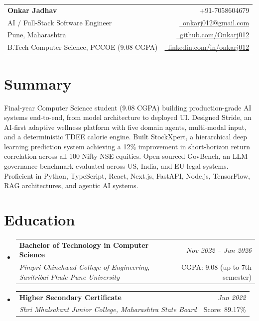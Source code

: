 \documentclass[a4paper,11pt]{article}
\makeatletter
\newcommand{\resumeSubheading}[4]{
\vspace{0.5mm}\item
    \begin{tabular*}{0.98\textwidth}[t]{l@{\extracolsep{\fill}}r}
        \textbf{#1} & \textit{\footnotesize{#4}} \\
        \textit{\footnotesize{#3}} & \footnotesize{#2}\\
    \end{tabular*}
    \vspace{-2.4mm}
}
\newcommand{\resumeSubHeadingListStart}{\begin{itemize}[leftmargin=*,labelsep=0mm]}
\newcommand{\resumeSubHeadingListEnd}{\end{itemize}\vspace{2mm}}
\newcommand{\name}{Onkar Jadhav}
\newcommand{\phone}{7058604679}
\newcommand{\emaila}{onkarj012@gmail.com}
\newcommand{\github}{github.com/Onkarj012}
\newcommand{\linkedin}{linkedin.com/in/onkarj012}
\makeatother
\begin{document}
\selectfont

\begin{tabularx}{\linewidth}{L r}
  \textbf{\Large \name} & {\raisebox{0.0\height}{\footnotesize \faPhone}\ +91-\phone}\\
  {AI / Full-Stack Software Engineer} & \href{mailto:\emaila}{\raisebox{0.0\height}{\footnotesize \faEnvelope}\ {\emaila}} \\
  {Pune, Maharashtra} & \href{https://\github}{\raisebox{0.0\height}{\footnotesize \faGithub}\ {\github}} \\
  {B.Tech Computer Science, PCCOE (9.08 CGPA)} & \href{https://\linkedin}{\raisebox{0.0\height}{\footnotesize \faLinkedin}\ {\linkedin}}
\end{tabularx}
\vspace{-5mm}

\section{\textbf{Summary}}
\vspace{1mm}
\small{
Final-year Computer Science student (9.08 CGPA) building production-grade AI systems end-to-end, from model architecture to deployed UI. Designed Stride, an AI-first adaptive wellness platform with five domain agents, multi-modal input, and a deterministic TDEE calorie engine. Built StockXpert, a hierarchical deep learning prediction system achieving a 12\% improvement in short-horizon return correlation across all 100 Nifty NSE equities. Open-sourced GovBench, an LLM governance benchmark evaluated across US, India, and EU legal systems. Proficient in Python, TypeScript, React, Next.js, FastAPI, Node.js, TensorFlow, RAG architectures, and agentic AI systems.
}
\vspace{-5mm}

\section{\textbf{Education}}
  \resumeSubHeadingListStart
    \resumeSubheading
      {Bachelor of Technology in Computer Science}{CGPA: 9.08 (up to 7th semester)}
      {Pimpri Chinchwad College of Engineering, Savitribai Phule Pune University}{Nov 2022 -- Jun 2026}
    \resumeSubheading
      {Higher Secondary Certificate}{Score: 89.17\%}
      {Shri Mhalsakant Junior College, Maharashtra State Board}{Jun 2022}
  \resumeSubHeadingListEnd
\vspace{-4mm}
\end{document}
